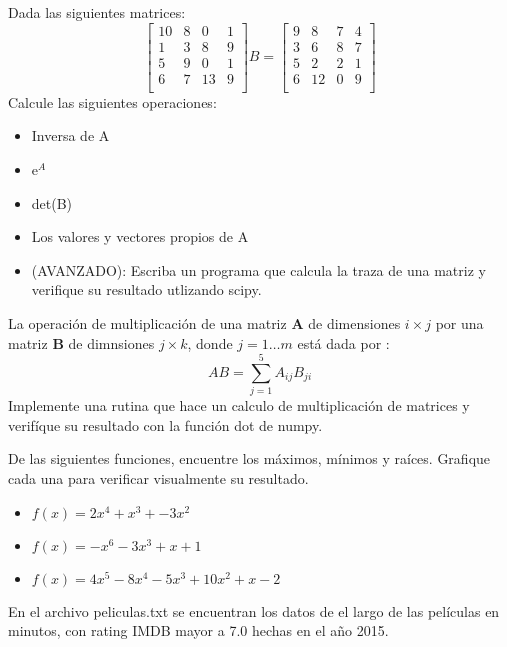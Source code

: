 \documentclass[5pt]{exam}
\begin{document}
{\begin{questions}
\item Dada las siguientes matrices:
\[
\begin{bmatrix}
      10  & 8  & 0 &  1  \\
      1   &  3 & 8 &  9 \\
      5   &  9 & 0 &  1 \\
      6   &  7 & 13 & 9 \\
\end{bmatrix}
B =
\begin{bmatrix}
      9  & 8  & 7 &  4  \\
      3   &  6 & 8 &  7 \\
      5   &  2 & 2 &  1 \\
      6   &  12 & 0 & 9 \\
\end{bmatrix}
\]
Calcule las siguientes operaciones:
\begin{itemize}
    \item Inversa de A
    \item   e$^A$
    \item det(B)
    \item Los valores y vectores propios de A
    \item (AVANZADO): Escriba un programa que calcula la traza de una matriz y verifique su resultado utlizando scipy.
\end{itemize}

\item La operación de multiplicación de una matriz \textbf{A} de dimensiones $i\times j$ por una  matriz \textbf{B} de 
dimnsiones $j\times k $, donde $j=1\dots m $  está dada por :
\begin{equation}
    \label{} AB = \sum_{j=1}^5 A_{ij}B_{ji}
\end{equation}
Implemente una rutina que hace un calculo de multiplicación de matrices y verifíque su resultado con la función
dot de numpy.

\item  De las siguientes funciones, encuentre los máximos, mínimos y raíces. Grafique cada una para verificar visualmente su resultado.
    \begin{itemize}
        \item $f(x) = 2x^4 + x^3 + −3x^2$
        \item $f(x) = −x^6 − 3x^3 + x + 1$
        \item $f(x) = 4x^5 − 8x^4 − 5x^3 + 10x^2 + x − 2$
    \end{itemize}

\item En el archivo peliculas.txt se encuentran los datos de el largo de las películas en minutos, con 
rating IMDB mayor a 7.0 hechas en el año 2015.
    \begin{parts}

\end{parts}
\end{questions}}
\end{document}
